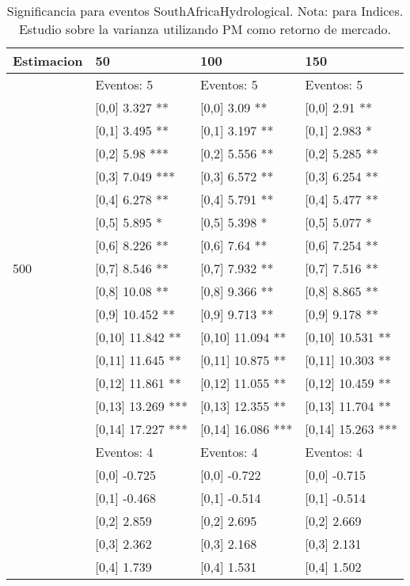 \begin{table}

\caption{Significancia para eventos SouthAfricaHydrological. Nota: para Indices. Estudio sobre la varianza utilizando PM como retorno de mercado.}
\centering
\begin{tabular}[t]{llll}
\toprule
Estimacion & 50 & 100 & 150\\
\midrule
 & Eventos:  5 & Eventos:  5 & Eventos:  5\\
 & {}[0,0] 3.327 ** & {}[0,0] 3.09 ** & {}[0,0] 2.91 **\\
 & {}[0,1] 3.495 ** & {}[0,1] 3.197 ** & {}[0,1] 2.983 *\\
 & {}[0,2] 5.98 *** & {}[0,2] 5.556 ** & {}[0,2] 5.285 **\\
 & {}[0,3] 7.049 *** & {}[0,3] 6.572 ** & {}[0,3] 6.254 **\\
\addlinespace
 & {}[0,4] 6.278 ** & {}[0,4] 5.791 ** & {}[0,4] 5.477 **\\
 & {}[0,5] 5.895 * & {}[0,5] 5.398 * & {}[0,5] 5.077 *\\
 & {}[0,6] 8.226 ** & {}[0,6] 7.64 ** & {}[0,6] 7.254 **\\
500 & {}[0,7] 8.546 ** & {}[0,7] 7.932 ** & {}[0,7] 7.516 **\\
 & {}[0,8] 10.08 ** & {}[0,8] 9.366 ** & {}[0,8] 8.865 **\\
\addlinespace
 & {}[0,9] 10.452 ** & {}[0,9] 9.713 ** & {}[0,9] 9.178 **\\
 & {}[0,10] 11.842 ** & {}[0,10] 11.094 ** & {}[0,10] 10.531 **\\
 & {}[0,11] 11.645 ** & {}[0,11] 10.875 ** & {}[0,11] 10.303 **\\
 & {}[0,12] 11.861 ** & {}[0,12] 11.055 ** & {}[0,12] 10.459 **\\
 & {}[0,13] 13.269 *** & {}[0,13] 12.355 ** & {}[0,13] 11.704 **\\
\addlinespace
 & {}[0,14] 17.227 *** & {}[0,14] 16.086 *** & {}[0,14] 15.263 ***\\
 & Eventos:  4 & Eventos:  4 & Eventos:  4\\
 & {}[0,0] -0.725 & {}[0,0] -0.722 & {}[0,0] -0.715\\
 & {}[0,1] -0.468 & {}[0,1] -0.514 & {}[0,1] -0.514\\
 & {}[0,2] 2.859 & {}[0,2] 2.695 & {}[0,2] 2.669\\
\addlinespace
 & {}[0,3] 2.362 & {}[0,3] 2.168 & {}[0,3] 2.131\\
 & {}[0,4] 1.739 & {}[0,4] 1.531 & {}[0,4] 1.502\\

\end{tabular}
\end{table}
